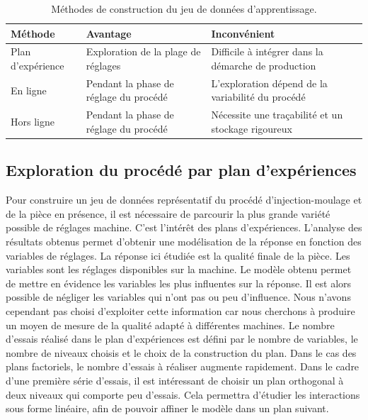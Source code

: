 \begin{table}[hbtp]
    \hspace*{-8mm}
    \begin{tabular}{|l|l|l|}
        \arrayrulecolor{black}
        \hline
        Méthode           & Avantage                                           & Inconvénient                                        \\ \hline
        \hline
        Plan d’expérience & Exploration de la plage de réglages  & Difficile à intégrer dans la démarche de production \\ \hline
        En ligne          & Pendant la phase de réglage du procédé & L’exploration dépend de la variabilité du procédé    \\ \hline
        Hors ligne        & Pendant la phase de réglage du procédé & Nécessite une traçabilité et un stockage rigoureux \\ \hline
    \end{tabular}
    \caption{Méthodes de construction du jeu de données d'apprentissage.}
    \label{tab:dataset}
\end{table}

\subsection{Exploration du procédé par plan d'expériences} \label{subsec:l12_doe}
Pour construire un jeu de données représentatif du procédé d'injection-moulage et de la pièce en présence, il est nécessaire de parcourir la plus grande variété possible de réglages machine.
C'est l'intérêt des plans d'expériences.
L'analyse des résultats obtenus permet d'obtenir une modélisation de la réponse en fonction des variables de réglages.
La réponse ici étudiée est la qualité finale de la pièce.
Les variables sont les réglages disponibles sur la machine. Le modèle obtenu permet de mettre en évidence les variables les plus influentes sur la réponse.
Il est alors possible de négliger les variables qui n'ont pas ou peu d'influence.
Nous n'avons cependant pas choisi d'exploiter cette information car nous cherchons à produire un moyen de mesure de la qualité adapté à différentes machines.
Le nombre d'essais réalisé dans le plan d'expériences est défini par le nombre de variables, le nombre de niveaux choisis et le choix de la construction du plan.
Dans le cas des plans factoriels, le nombre d'essais à réaliser augmente rapidement.
Dans le cadre d'une première série d'essais, il est intéressant de choisir un plan orthogonal à deux niveaux qui comporte peu d'essais.
Cela permettra d'étudier les interactions sous forme linéaire, afin de pouvoir affiner le modèle dans un plan suivant.

